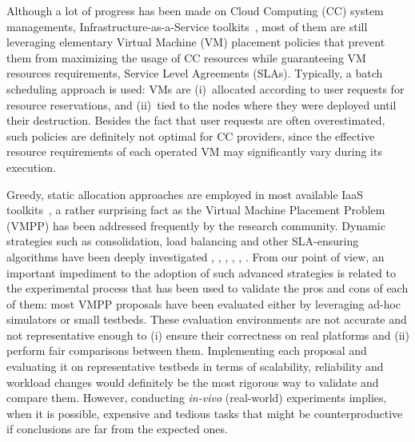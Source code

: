 \documentclass[conference]{IEEEtran}
\begin{document}
Although a lot of progress has been made on Cloud Computing (CC)
system managements, \aka Infrastructure-as-a-Service
toolkits~\cite{moreno:2012}, most of them are still leveraging
elementary Virtual Machine (VM) placement policies that prevent them
from maximizing the usage of CC resources while guaranteeing VM
resources requirements, \aka Service Level Agreements (SLAs).
Typically, a batch scheduling approach is used: VMs are (i)~allocated
according to user requests for resource reservations, and (ii)~tied to
the nodes where they were deployed until their destruction. Besides
the fact that user requests are often overestimated, such policies are
definitely not optimal for CC providers, since the effective resource
requirements of each operated VM may significantly vary during its
execution.

Greedy, static allocation approaches are employed in most available
IaaS toolkits~\cite{openstack, opennebula, cloudstack}, a rather
surprising fact as the Virtual Machine Placement Problem (VMPP) has
been addressed frequently by the research community. Dynamic
strategies such as consolidation, load balancing and other
SLA-ensuring algorithms have been deeply investigated
\cite{Hermenier:2009:ECM:1508293.1508300}, \cite{feller:ccgrid12},
\cite{quesnel:cpe2012}, \cite{5935254}, \cite{5715067},
\cite{5328077}.
From our point of view, an important impediment to the adoption of
such advanced strategies is related to the experimental process that
has been used to validate the pros and cons of each of them: most VMPP
proposals have been evaluated either by leveraging ad-hoc simulators
or small testbeds. These evaluation environments are not accurate and not
representative enough to (i) ensure their correctness on real
platforms and (ii) perform fair comparisons between them.
%
Implementing each proposal and evaluating it on representative
testbeds in terms of scalability, reliability and workload changes
would definitely be the most rigorous way to validate and compare
them. However,  conducting \textit{in-vivo}
 (\ie real-world) experiments implies,
when it is possible, expensive and tedious tasks that might be
counterproductive if conclusions are far from the expected ones.
%
\end{document}
